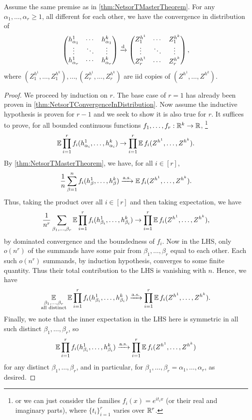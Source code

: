 \documentclass[main.tex]{subfiles}
\begin{document}
\begin{thm}\label{thm:NetsorTMultiConvergenceInDistribution}
Assume the same premise as in \cref{thm:NetsorTMasterTheorem}. 
For any $\alpha_{1},\ldots,\alpha_{r}\ge1$, all different for each other, we have the convergence in distribution of
\[
\begin{pmatrix}h_{\alpha_{1}}^{1} & \cdots & h_{\alpha_{1}}^{k}\\
\vdots & \ddots & \vdots\\
h_{\alpha_{r}}^{1} & \cdots & h_{\alpha_{r}}^{k}
\end{pmatrix}\xrightarrow{\mathrm{d}}\begin{pmatrix}Z_{1}^{h^{1}} & \cdots & Z_{1}^{h^{k}}\\
\vdots & \ddots & \vdots\\
Z_{r}^{h^{1}} & \cdots & Z_{r}^{h^{k}}
\end{pmatrix},
\]
where $(Z_{1}^{h^{1}},\ldots,Z_{1}^{h^{k}}),\ldots,(Z_{r}^{h^{1}},\ldots,Z_{r}^{h^{k}})$ are iid copies of $(Z^{h^{1}},\ldots,Z^{h^{k}})$.
\end{thm}

\begin{proof}
We proceed by induction on $r$. The base case of $r=1$ has already been proven in \cref{thm:NetsorTConvergenceInDistribution}. Now assume the inductive hypothesis is proven for $r-1$ and we seek to show it is also true for $r$. It suffices to prove, for all bounded continuous functions $f_{1},\ldots,f_{r}:\mathbb{R}^{k}\to\mathbb{R}$, \footnote{or we can just consider the families $f_{i}(x)=e^{it_{i}x}$ (or their real and imaginary parts), where $\{t_{i}\}_{i=1}^{r}$ varies over $\mathbb{R}^{r}$.}
\[
\operatorname*{\mathbb{E}}\prod_{i=1}^{r}f_{i}(h_{\alpha_{i}}^{1},\ldots,h_{\alpha_{i}}^{k})\to\prod_{i=1}^{r}\operatorname*{\mathbb{E}} f_{i}(Z^{h^{1}},\ldots,Z^{h^{k}}).
\]
By \cref{thm:NetsorTMasterTheorem}, we have, for all $i\in[r]$,
\[
\frac{1}{n}\sum_{\beta=1}^{n}f_{i}(h_{\beta}^{1},\ldots,h_{\beta}^{k})\xrightarrow{\mathrm{a.s.}}\operatorname*{\mathbb{E}} f_{i}(Z^{h^{1}},\ldots,Z^{h^{k}}).
\]
Thus, taking the product over all $i\in[r]$ and then taking expectation, we have
\[
\frac{1}{n^{r}}\sum_{\beta_{1},\ldots,\beta_{r}}\operatorname*{\mathbb{E}}\prod_{i=1}^{r}f_{i}(h_{\beta_{i}}^{1},\ldots,h_{\beta_{i}}^{k})\to\prod_{i=1}^{r}\operatorname*{\mathbb{E}} f_{i}(Z^{h^{1}},\ldots,Z^{h^{k}}),
\]
by dominated convergence and the boundedness of $f_{i}$. Now in the LHS, only $o(n^{r})$ of the summands have some pair from $\beta_{1},\ldots,\beta_{r}$ equal to each other. Each such $o(n^{r})$ summands, by induction hypothesis, converges to some finite quantity. Thus their total contribution to the LHS is vanishing with $n$. Hence, we have
\[
\operatorname*{\mathbb{E}}_{\substack{\beta_{1},\ldots,\beta_{r}\\
\text{all distinct}
}
}\operatorname*{\mathbb{E}}\prod_{i=1}^{r}f_{i}(h_{\beta_{i}}^{1},\ldots,h_{\beta_{i}}^{k})\xrightarrow{\mathrm{a.s.}}\prod_{i=1}^{r}\operatorname*{\mathbb{E}} f_{i}(Z^{h^{1}},\ldots,Z^{h^{k}}).
\]
Finally, we note that the inner expectation in the LHS here is symmetric in all such distinct $\beta_{1},\ldots,\beta_{r}$, so 
\[
\operatorname*{\mathbb{E}}\prod_{i=1}^{r}f_{i}(h_{\beta_{i}}^{1},\ldots,h_{\beta_{i}}^{k})\xrightarrow{\mathrm{a.s.}}\prod_{i=1}^{r}\operatorname*{\mathbb{E}} f_{i}(Z^{h^{1}},\ldots,Z^{h^{k}})
\]
for any distinct $\beta_{1},\ldots,\beta_{r}$, and in particular, for $\beta_{1},\ldots,\beta_{r}=\alpha_{1},\ldots,\alpha_{r}$, as desired.
\end{proof}
\end{document}

